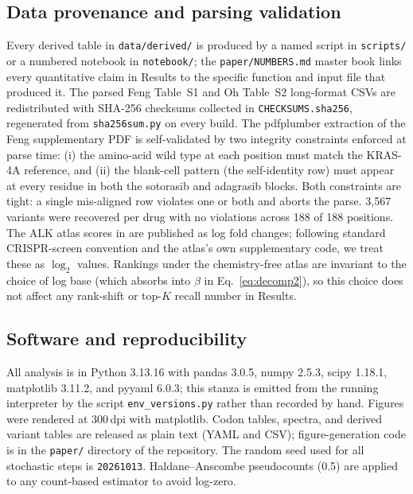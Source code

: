 \documentclass[11pt,a4paper]{article}
\begin{document}
\subsection{Data provenance and parsing validation}
\label{sec:provenance}
Every derived table in \texttt{data/derived/} is produced by a named
script in \texttt{scripts/} or a numbered notebook in
\texttt{notebook/}; the \texttt{paper/NUMBERS.md} master book links
every quantitative claim in Results to the specific function and input
file that produced it. The parsed Feng Table~S1 and Oh Table~S2
long-format CSVs are redistributed with SHA-256 checksums collected
in \texttt{CHECKSUMS.sha256}, regenerated from
\texttt{sha256sum.py} on every build.
The pdfplumber extraction of the Feng supplementary PDF
is self-validated by two integrity constraints enforced at parse time:
(i) the amino-acid wild type at each position must match the KRAS-4A
reference, and (ii) the blank-cell pattern (the self-identity row) must
appear at every residue in both the sotorasib and adagrasib blocks.
Both constraints are tight: a single mis-aligned row violates one or
both and aborts the parse. 3,567 variants were recovered per drug with
no violations across 188 of 188 positions. The ALK atlas scores in
\citep{oh2026} are published as log fold changes; following standard
CRISPR-screen convention and the atlas's own supplementary code, we
treat these as $\log_2$ values. Rankings under the chemistry-free
atlas are invariant to the choice of log base (which absorbs into
$\beta$ in Eq.~\ref{eq:decomp2}), so this choice does not affect any
rank-shift or top-$K$ recall number in Results.

\subsection{Software and reproducibility}

All analysis is in Python 3.13.16 with pandas 3.0.5, numpy 2.5.3,
scipy 1.18.1, matplotlib 3.11.2, and pyyaml 6.0.3; this stanza is
emitted from the running interpreter by the script
\texttt{env\_versions.py} rather than recorded by hand. Figures were
rendered at 300\,dpi with matplotlib. Codon tables, spectra, and
derived variant tables are released as plain text (YAML and CSV);
figure-generation code is in the \texttt{paper/} directory of the
repository. The random seed used for all stochastic steps is
\texttt{20261013}. Haldane--Anscombe pseudocounts (0.5) are applied
to any count-based estimator to avoid log-zero.


\end{document}
